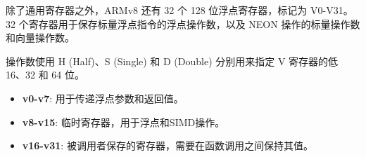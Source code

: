 除了通用寄存器之外，ARMv8 还有 32 个 128 位浮点寄存器，标记为 V0-V31。
32 个寄存器用于保存标量浮点指令的浮点操作数，以及 NEON 操作的标量操作数和向量操作数。

操作数使用 H (Half)、S (Single) 和 D (Double) 分别用来指定 V 寄存器的低 16、32 和 64 位。

\begin{itemize}
  \item
    \textbf{v0-v7}: 用于传递浮点参数和返回值。
  \item
    \textbf{v8-v15}: 临时寄存器，用于浮点和SIMD操作。
  \item
    \textbf{v16-v31}: 被调用者保存的寄存器，需要在函数调用之间保持其值。
\end{itemize}
